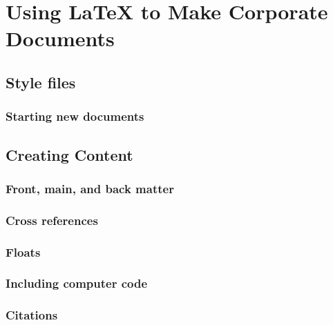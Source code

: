 \section{Using LaTeX to Make Corporate Documents }


\subsection{Style files}\label{sec:Corporatecls}


\subsubsection{Starting new documents}\label{sec:NewDocs}


\subsection{Creating Content}
\subsubsection{Front, main, and back matter}


\subsubsection{Cross references}


\subsubsection{Floats}


\subsubsection{Including computer code}\label{Sec:Codes}


\subsubsection{Citations}\label{Sec:Citations}


